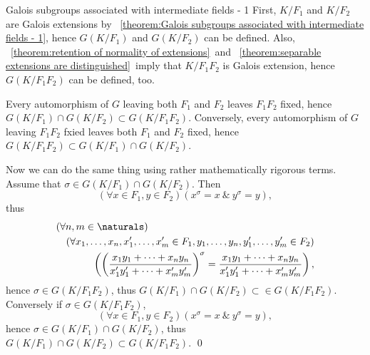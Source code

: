 \documentclass[17pt,landscape]{foils}
\begin{document}
{{{\begin{myproof}{Galois subgroups associated with intermediate fields - 1}
	First, $K/F_1$ and $K/F_2$ are Galois extensions
	by \theoremname~\ref{theorem:Galois subgroups associated with intermediate fields - 1},
	hence $G(K/F_1)$ and $G(K/F_2)$ can be defined.
	Also, \theoremname~\ref{theorem:retention of normality of extensions}\
	and \theoremname~\ref{theorem:separable extensions are distinguished}\
	imply that $K/F_1F_2$ is Galois extension,
	hence $G(K/F_1F_2)$ can be defined, too.

	Every automorphism of $G$ leaving both $F_1$ and $F_2$ leaves $F_1F_2$ fixed,
	hence $G(K/F_1)\cap G(K/F_2)\subset G(K/F_1F_2)$.
	Conversely,
	every automorphism of $G$ leaving $F_1F_2$ fxied
	leaves both $F_1$ and $F_2$ fixed,
	hence $G(K/F_1F_2)\subset G(K/F_1) \cap G(K/F_2)$.

	Now we can do the same thing using rather mathematically rigorous terms.
	Assume that $\sigma \in G(K/F_1) \cap G(K/F_2)$.
	Then
	$$
		\left(
			\forall x\in F_1, y\in F_2
		\right)
		\left(
			x^\sigma = x
			\ \& \ %
			y^\sigma = y
		\right),
	$$
	thus
	\begin{eqnarray*}
	\lefteqn{
		\left(
			\forall n,m\in \naturals
		\right)
	}
	\\
	&&
		\left(
			\forall
			x_1,\ldots, x_n,
			x'_1,\ldots, x'_m
				\in F_1,
			y_1, \ldots, y_n,
			y'_1, \ldots, y'_m
				\in F_2
		\right)
	\\
	&&
		\left(
			\left(
			\frac{
			x_1y_1 + \cdots + x_ny_n
			}
			{
			x'_1y'_1 + \cdots + x'_my'_m
			}
			\right)
			^\sigma
			=
			\frac{
				x_1y_1 + \cdots + x_ny_n
			}
			{
				x'_1y'_1 + \cdots + x'_my'_m
			}
		\right),
	\end{eqnarray*}
	hence $\sigma \in G(K/F_1F_2)$,
	thus $G(K/F_1) \cap G(K/F_2)\subset \in G(K/F_1F_2)$.
	Conversely if $\sigma \in G(K/F_1F_2)$,
	$$
		\left(
			\forall x\in F_1, y\in F_2
		\right)
		\left(
			x^\sigma = x
			\ \& \ %
			y^\sigma = y
		\right),
	$$
	hence $\sigma \in G(K/F_1) \cap G(K/F_2)$,
	thus
	$G(K/F_1) \cap G(K/F_2) \subset G(K/F_1F_2)$.
	\qed\
\end{myproof}

%

}}}
\end{document}
